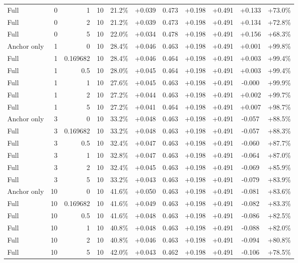\begin{table}[htbp]
\begin{tabular}{lrrrccccccc}
Full & 0 & 1 & 10 & 21.2\% & +0.039 & 0.473 & +0.198 & +0.491 & +0.133 & +73.0\% \\
Full & 0 & 2 & 10 & 21.2\% & +0.039 & 0.473 & +0.198 & +0.491 & +0.134 & +72.8\% \\
Full & 0 & 5 & 10 & 22.0\% & +0.034 & 0.478 & +0.198 & +0.491 & +0.156 & +68.3\% \\
Anchor only & 1 & 0 & 10 & 28.4\% & +0.046 & 0.463 & +0.198 & +0.491 & +0.001 & +99.8\% \\
Full & 1 & 0.169682 & 10 & 28.4\% & +0.046 & 0.464 & +0.198 & +0.491 & +0.003 & +99.4\% \\
Full & 1 & 0.5 & 10 & 28.0\% & +0.045 & 0.464 & +0.198 & +0.491 & +0.003 & +99.4\% \\
Full & 1 & 1 & 10 & 27.6\% & +0.045 & 0.463 & +0.198 & +0.491 & -0.000 & +99.9\% \\
Full & 1 & 2 & 10 & 27.2\% & +0.044 & 0.463 & +0.198 & +0.491 & +0.002 & +99.7\% \\
Full & 1 & 5 & 10 & 27.2\% & +0.041 & 0.464 & +0.198 & +0.491 & +0.007 & +98.7\% \\
Anchor only & 3 & 0 & 10 & 33.2\% & +0.048 & 0.463 & +0.198 & +0.491 & -0.057 & +88.5\% \\
Full & 3 & 0.169682 & 10 & 33.2\% & +0.048 & 0.463 & +0.198 & +0.491 & -0.057 & +88.3\% \\
Full & 3 & 0.5 & 10 & 32.4\% & +0.047 & 0.463 & +0.198 & +0.491 & -0.060 & +87.7\% \\
Full & 3 & 1 & 10 & 32.8\% & +0.047 & 0.463 & +0.198 & +0.491 & -0.064 & +87.0\% \\
Full & 3 & 2 & 10 & 32.4\% & +0.045 & 0.463 & +0.198 & +0.491 & -0.069 & +85.9\% \\
Full & 3 & 5 & 10 & 33.2\% & +0.043 & 0.463 & +0.198 & +0.491 & -0.079 & +83.9\% \\
Anchor only & 10 & 0 & 10 & 41.6\% & +0.050 & 0.463 & +0.198 & +0.491 & -0.081 & +83.6\% \\
Full & 10 & 0.169682 & 10 & 41.6\% & +0.049 & 0.463 & +0.198 & +0.491 & -0.082 & +83.3\% \\
Full & 10 & 0.5 & 10 & 41.6\% & +0.048 & 0.463 & +0.198 & +0.491 & -0.086 & +82.5\% \\
Full & 10 & 1 & 10 & 40.8\% & +0.048 & 0.463 & +0.198 & +0.491 & -0.088 & +82.0\% \\
Full & 10 & 2 & 10 & 40.8\% & +0.046 & 0.463 & +0.198 & +0.491 & -0.094 & +80.8\% \\
Full & 10 & 5 & 10 & 42.0\% & +0.043 & 0.462 & +0.198 & +0.491 & -0.106 & +78.5\% \\

\end{tabular}
\end{table}
